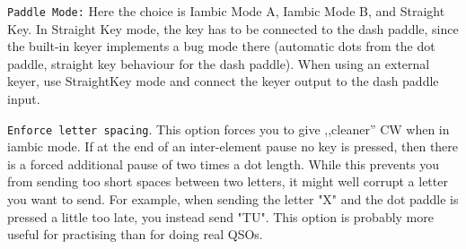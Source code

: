 \documentclass[12pt]{book}
\def\rett#1{\texttt{\color{red}#1}}
\def\pH{pi\-HPSDR }
\begin{document}
%

\rett{Paddle Mode:} Here the choice is Iambic Mode A, Iambic Mode B,
and  Straight Key. In Straight Key mode, the key has to be connected
to the dash paddle, since the built-in keyer implements a bug mode
there (automatic dots from the dot paddle, straight key behaviour
for the dash paddle). When using an external keyer, use StraightKey
mode and connect the keyer output to the dash paddle input.

\rett{Enforce letter spacing}. This option forces you to give ,,cleaner'' CW
when in iambic mode. If at the end of an inter-element pause no key is
pressed, then there is a forced additional pause of two times a dot length. While this
prevents you from sending too short spaces between two letters, it
might well corrupt a letter you want to send. For example, when sending
the letter "X" and the dot paddle is pressed a little too late, you
instead send "TU". This option is probably more useful for practising than
for doing real QSOs.
\end{document}

